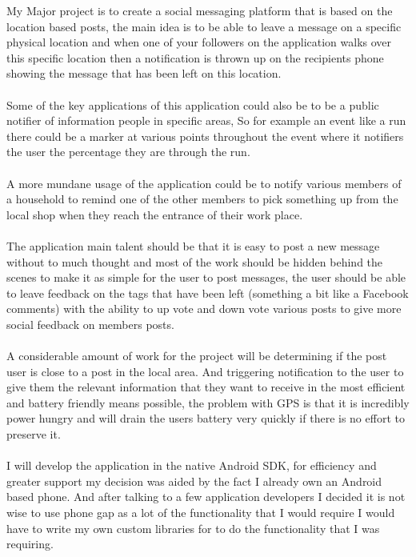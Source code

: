 \documentclass[11pt,fleqn,twoside]{article}
\begin{document}
My Major project is to create a social messaging platform that is based on the location based posts, the main idea is to be able to leave a message on a specific physical location and when one of your followers on the application walks over this specific location then a notification is thrown up on the recipients phone showing the message that has been left on this location. \\
\\
Some of the key applications of this application could also be to be a public notifier of information people in specific areas, So for example an event like a run there could be a marker at various points throughout the event where it notifiers the user the percentage they are through the run. \\
\\
A more mundane usage of the application could be to notify various members of a household to remind one of the other members to pick something up from the local shop when they reach the entrance of their work place. \\
\\
The application main talent should be that it is easy to post a new message without to much thought and most of the work should be hidden behind the scenes to make it as simple for the user to post messages, the user should be able to leave feedback on the tags that have been left (something a bit like a Facebook comments) with the ability to up vote and down vote various posts to give more social feedback on members posts.\\
\\
A considerable amount of work for the project will be determining if the post user is close to a post in the local area. And triggering notification to the user to give them the relevant information that they want to receive in the most efficient and battery friendly means possible, the problem with GPS is that it is incredibly power hungry and will drain the users battery very quickly if there is no effort to preserve it.\\
\\
I will develop the application in the native Android SDK, for efficiency and greater support my decision was aided by the fact I already own an Android based phone. And after talking to a few application developers I decided it is not wise to use phone gap as a lot of the functionality that I would require I would have to write my own custom libraries for to do the functionality that I was requiring.\\
\\
\end{document}
